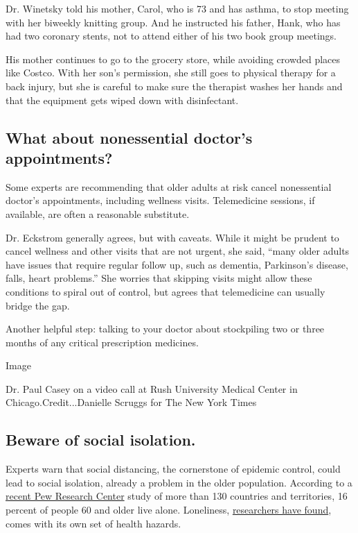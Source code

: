 Dr. Winetsky told his mother, Carol, who is 73 and has asthma, to stop
meeting with her biweekly knitting group. And he instructed his father,
Hank, who has had two coronary stents, not to attend either of his two
book group meetings.

His mother continues to go to the grocery store, while avoiding crowded
places like Costco. With her son's permission, she still goes to
physical therapy for a back injury, but she is careful to make sure the
therapist washes her hands and that the equipment gets wiped down with
disinfectant.

\hypertarget{what-about-nonessential-doctors-appointments}{%
\subsection{What about nonessential doctor's
appointments?}\label{what-about-nonessential-doctors-appointments}}

Some experts are recommending that older adults at risk cancel
nonessential doctor's appointments, including wellness visits.
Telemedicine sessions, if available, are often a reasonable substitute.

Dr. Eckstrom generally agrees, but with caveats. While it might be
prudent to cancel wellness and other visits that are not urgent, she
said, ``many older adults have issues that require regular follow up,
such as dementia, Parkinson's disease, falls, heart problems.'' She
worries that skipping visits might allow these conditions to spiral out
of control, but agrees that telemedicine can usually bridge the gap.

Another helpful step: talking to your doctor about stockpiling two or
three months of any critical prescription medicines.

Image

Dr. Paul Casey on a video call at Rush University Medical Center in
Chicago.Credit...Danielle Scruggs for The New York Times

\hypertarget{beware-of-social-isolation}{%
\subsection{Beware of social
isolation.}\label{beware-of-social-isolation}}

Experts warn that social distancing, the cornerstone of epidemic
control, could lead to social isolation, already a problem in the older
population. According to a
\href{https://www.pewresearch.org/fact-tank/2020/03/10/older-people-are-more-likely-to-live-alone-in-the-u-s-than-elsewhere-in-the-world/}{recent
Pew Research Center} study of more than 130 countries and territories,
16 percent of people 60 and older live alone. Loneliness,
\href{https://www.nytimes3xbfgragh.onion/2016/09/06/health/lonliness-aging-health-effects.html}{researchers
have found}, comes with its own set of health hazards.

